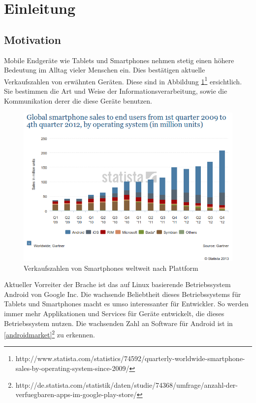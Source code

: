 \section{Einleitung}

\subsection{Motivation}

Mobile Endgeräte wie Tablets und Smartphones nehmen stetig einen höhere Bedeutung im Alltag vieler Menschen ein. Dies bestätigen aktuelle Verkaufszahlen von erwähnten Geräten. Diese sind in Abbildung \ref{sale1}\footnote{http://www.statista.com/statistics/74592/quarterly-worldwide-smartphone-sales-by-operating-system-since-2009/} ersichtlich. Sie bestimmen die Art und Weise der Informationsverarbeitung, sowie die Kommunikation derer die diese Geräte benutzen.

\begin{figure}[h!t]
\begin{center}
\includegraphics[scale=0.6]{images/sale}
\caption{Verkaufszahlen von Smartphones weltweit nach Plattform}
\label{sale1}
\end{center}
\end{figure}

Aktueller Vorreiter der Brache ist das auf Linux basierende Betriebssystem Android von Google Inc. Die wachsende Beliebtheit dieses Betriebssystems für Tablets und Smartphones macht es umso interessanter für Entwickler. So werden immer mehr Applikationen und Services für Geräte entwickelt, die dieses Betriebssystem nutzen. Die wachsenden Zahl an Software für Android ist in \ref*{androidmarket}\footnote{http://de.statista.com/statistik/daten/studie/74368/umfrage/anzahl-der-verfuegbaren-apps-im-google-play-store/} zu erkennen. 

